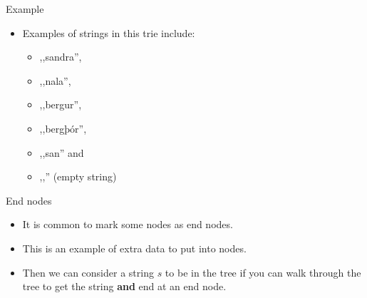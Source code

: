 \documentclass{beamer}
\begin{document}
\begin{frame}[plain]{Example}
		\begin{itemize}
			\item Examples of strings in this trie include:
			\begin{itemize}
				\item<3-> ,,sandra'',
				\item<4-> ,,nala'',
				\item<5-> ,,bergur'',
				\item<6-> ,,bergþór'',
				\item<7-> ,,san'' and
				\item<8-> ,,'' (empty string)
			\end{itemize}
		\end{itemize}
	\end{frame}
	
	\begin{frame}[plain]{End nodes}
		\begin{itemize}
			\item It is common to mark some nodes as end nodes.
			\item This is an example of extra data to put into nodes.
			\item Then we can consider a string $s$ to be in the tree if you can walk through the tree to get the string \textbf{and} end at an end node.
		\end{itemize}
	\end{frame}
	
\end{document}

